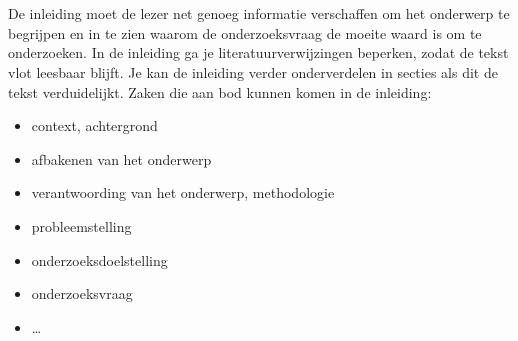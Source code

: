 
\chapter{}%
\label{ch:inleiding}

De inleiding moet de lezer net genoeg informatie verschaffen om het onderwerp te begrijpen en in te zien waarom de onderzoeksvraag de moeite waard is om te onderzoeken. In de inleiding ga je literatuurverwijzingen beperken, zodat de tekst vlot leesbaar blijft. Je kan de inleiding verder onderverdelen in secties als dit de tekst verduidelijkt. Zaken die aan bod kunnen komen in de inleiding:

\begin{itemize}
  \item context, achtergrond
  \item afbakenen van het onderwerp
  \item verantwoording van het onderwerp, methodologie
  \item probleemstelling
  \item onderzoeksdoelstelling
  \item onderzoeksvraag
  \item \ldots
\end{itemize}

\section{}%
\label{sec:probleemstelling}

